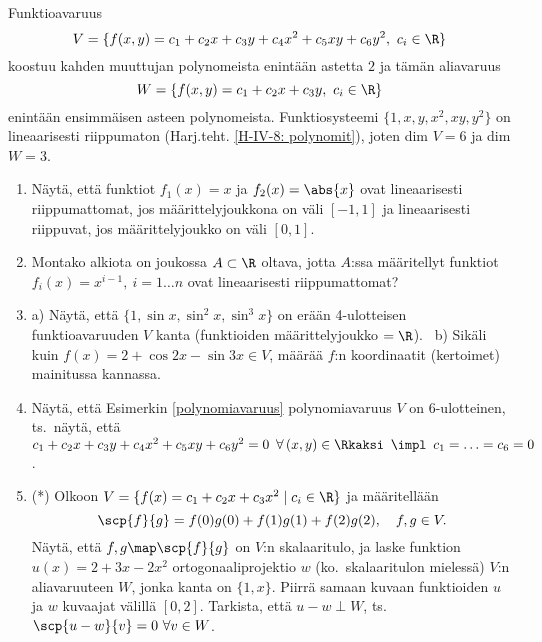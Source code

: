 \begin{Exa} \label{polynomiavaruus}
Funktioavaruus
\[
V=\{f(x,y)=c_1+c_2x+c_3y+c_4x^2+c_5xy+c_6y^2,\ c_i\in\R\}
\]
koostuu kahden muuttujan polynomeista enintään astetta $2$ ja tämän aliavaruus
\[
W=\{f(x,y)=c_1+c_2x+c_3y,\ c_i\in\R\}
\]
enintään ensimmäisen asteen polynomeista. Funktiosysteemi $\{1,x,y,x^2,xy,y^2\}$ on 
lineaarisesti riippumaton (Harj.teht. \ref{H-IV-8: polynomit}), joten dim $V=6$ ja dim $W=3$.
\loppu
\end{Exa} 

\Harj
\begin{enumerate}

\item
Näytä, että funktiot $f_1(x)=x$ ja $f_2(x)=\abs{x}$ ovat lineaarisesti riippumattomat, jos
määrittelyjoukkona on väli $[-1,1]$ ja lineaarisesti riippuvat, jos määrittelyjoukko on
väli $[0,1]$.

\item
Montako alkiota on joukossa $A\subset\R$ oltava, jotta $A$:ssa määritellyt funktiot
$f_i(x)=x^{i-1},\ i=1 \ldots n$ ovat lineaarisesti riippumattomat?

\item
a) Näytä, että $\{1,\sin x,\sin^2 x,\sin^3 x\}$ on erään 4-ulotteisen funktioavaruuden
$V$ kanta (funktioiden määrittelyjoukko $=\R$). \ b) Sikäli kuin 
$f(x)=2+\cos 2x-\sin 3x \in V$, määrää $f$:n koordinaatit (kertoimet) mainitussa kannassa.

\item \label{H-IV-8: polynomit}
Näytä, että Esimerkin \ref{polynomiavaruus} polynomiavaruus $V$ on 6-ulotteinen, ts.\ näytä, että
$c_1+c_2x+c_3y+c_4x^2+c_5xy+c_6y^2=0\,\ \forall\,(x,y)\in\Rkaksi\,\ \impl\,\ c_1 = \ldots 
=c_6=0$.

\item (*) Olkoon $V=\{f(x)=c_1+c_2x+c_3x^2 \mid c_i\in\R\}$ ja määritellään
\[
\scp{f}{g}=f(0)g(0)+f(1)g(1)+f(2)g(2), \quad f,g \in V.
\]
Näytä, että $f,g \map \scp{f}{g}$ on $V$:n skalaaritulo, ja laske funktion $u(x)=2+3x-2x^2$ 
ortogonaaliprojektio $w$ (ko.\ skalaaritulon mielessä) $V$:n aliavaruuteen $W$, jonka kanta
on $\{1,x\}$. Piirrä samaan kuvaan funktioiden $u$ ja $w$ kuvaajat välillä $[0,2]$. Tarkista,
että $u-w \perp W$, ts.\ $\scp{u-w}{v}=0\ \forall v \in W$.

\end{enumerate}